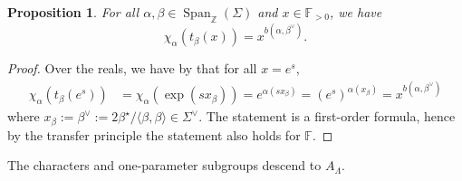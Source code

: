 \documentclass[12pt]{amsart}
\newcommand{\F}{\mathbb{F} }
\newcommand{\Z}{\mathbb{Z} }
\numberwithin{equation}{section}
\newtheorem{proposition}[theorem]{Proposition}
\theoremstyle{remark} %
\begin{document}
\begin{proposition}
	For all $\alpha, \beta \in \operatorname{Span}_{\Z}(\Sigma)$ and $x \in \F_{>0}$, we have 
	$$
	\chi_\alpha(t_\beta(x)) = x^{b(\alpha, \beta^\vee)}.
	$$
\end{proposition}
\begin{proof}
	Over the reals, we have by \cite[Lemma \ref{I-lem:oneparam_compatibility}]{AppAGRCF} that for all $x = e^s$,
	\begin{align*}
		\chi_\alpha\left(t_\beta\left(e^s\right)\right) &= \chi_\alpha \left( \exp \left( s x_\beta \right)\right) 
		= e^{\alpha(s x_\beta)} = \left(e^s\right)^{\alpha(x_\beta)} 
		= x^{b(\alpha, \beta^\vee)}
	\end{align*}
    where $x_\beta := \beta^\vee := 2\beta^\star /\langle \beta, \beta \rangle  \in \Sigma^\vee$. The statement is a first-order formula, hence by the transfer principle the statement also holds for $\F$.
\end{proof}

The characters and one-parameter subgroups descend to $A_\Lambda$. 
\end{document}
